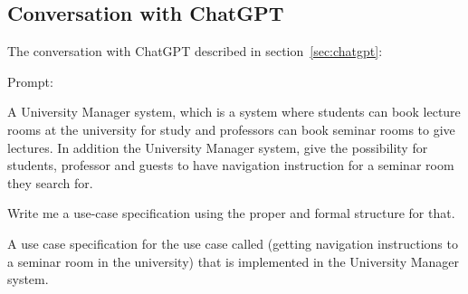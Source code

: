 \documentclass[conference,onecolumn]{IEEEtran}
\begin{document}
\newpage
\appendix

\subsection{Conversation with ChatGPT} \label{appdx:chatgpt}
 
The conversation with ChatGPT described in section~\ref{sec:chatgpt}:

Prompt:
\begin{framed}
	\small
	A University Manager system, which is a system where students can book lecture rooms at the university for study and professors can book seminar rooms to give lectures. In addition the University Manager system, give the possibility for students, professor and guests  to have navigation instruction for a seminar room they search for.
	
	Write me a use-case specification using the proper and formal structure for that.
	
	A use case specification for the use case called (getting navigation instructions to a seminar room in the university) that is implemented in the University Manager system.
\end{framed}
\end{document}
